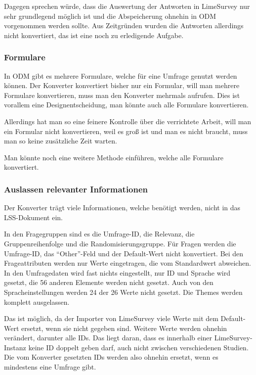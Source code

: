 Dagegen sprechen würde, dass die Auswertung der Antworten in LimeSurvey nur sehr grundlegend möglich ist und die Abspeicherung ohnehin in ODM vorgenommen werden sollte.
Aus Zeitgründen wurden die Antworten allerdings nicht konvertiert, das ist eine noch zu erledigende Aufgabe.

\subsubsection{Formulare}

In ODM gibt es mehrere Formulare, welche für eine Umfrage genutzt werden können.
Der Konverter konvertiert bisher nur ein Formular, will man mehrere Formulare konvertieren, muss man den Konverter mehrmals aufrufen.
Dies ist vorallem eine Designentscheidung, man könnte auch alle Formulare konvertieren.

Allerdings hat man so eine feinere Kontrolle über die verrichtete Arbeit, will man ein Formular nicht konvertieren, weil es groß ist und man es nicht braucht, muss man so keine zusätzliche Zeit warten.

Man könnte noch eine weitere Methode  einführen, welche alle Formulare konvertiert.

\subsubsection{Auslassen relevanter Informationen}

Der Konverter trägt viele Informationen, welche benötigt werden, nicht in das LSS-Dokument ein.

In den Fragegruppen sind es die Umfrage-ID, die Relevanz, die Gruppenreihenfolge und die Randomisierungsgruppe.
Für Fragen werden die Umfrage-ID, das \enquote{Other}-Feld und der Default-Wert nicht konvertiert.
Bei den Frageattributen werden nur Werte eingetragen, die vom Standardwert abweichen.
In den Umfragedaten wird fast nichts eingestellt, nur ID und Sprache wird gesetzt, die 56 anderen Elemente werden nicht gesetzt.
Auch von den Spracheinstellungen werden 24 der 26 Werte nicht gesetzt.
Die Themes werden komplett ausgelassen.

Das ist möglich, da der Importer von LimeSurvey viele Werte mit dem Default-Wert ersetzt, wenn sie nicht gegeben sind.
Weitere Werte werden ohnehin verändert, darunter alle IDs.
Das liegt daran, dass es innerhalb einer LimeSurvey-Instanz keine ID doppelt geben darf, auch nicht zwischen verschiedenen Studien.
Die vom Konverter gesetzten IDs werden also ohnehin ersetzt, wenn es mindestens eine Umfrage gibt.

